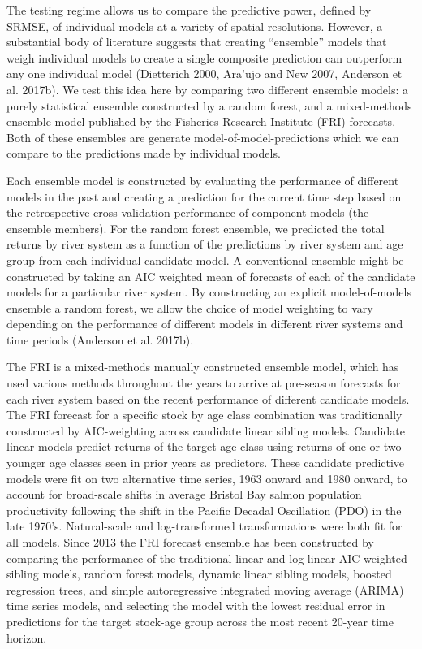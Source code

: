 \documentclass[
]{article}
\begin{document}
The testing regime allows us to compare the predictive power, defined by SRMSE, of individual models at a variety of spatial resolutions. However, a substantial body of literature suggests that creating ``ensemble'' models that weigh individual models to create a single composite prediction can outperform any one individual model (Dietterich 2000, Ara'ujo and New 2007, Anderson et al. 2017b). We test this idea here by comparing two different ensemble models: a purely statistical ensemble constructed by a random forest, and a mixed-methods ensemble model published by the Fisheries Research Institute (FRI) forecasts. Both of these ensembles are generate model-of-model-predictions which we can compare to the predictions made by individual models.

Each ensemble model is constructed by evaluating the performance of different models in the past and creating a prediction for the current time step based on the retrospective cross-validation performance of component models (the ensemble members). For the random forest ensemble, we predicted the total returns by river system as a function of the predictions by river system and age group from each individual candidate model. A conventional ensemble might be constructed by taking an AIC weighted mean of forecasts of each of the candidate models for a particular river system. By constructing an explicit model-of-models ensemble a random forest, we allow the choice of model weighting to vary depending on the performance of different models in different river systems and time periods (Anderson et al. 2017b).

The FRI is a mixed-methods manually constructed ensemble model, which has used various methods throughout the years to arrive at pre-season forecasts for each river system based on the recent performance of different candidate models. The FRI forecast for a specific stock by age class combination was traditionally constructed by AIC-weighting across candidate linear sibling models. Candidate linear models predict returns of the target age class using returns of one or two younger age classes seen in prior years as predictors. These candidate predictive models were fit on two alternative time series, 1963 onward and 1980 onward, to account for broad-scale shifts in average Bristol Bay salmon population productivity following the shift in the Pacific Decadal Oscillation (PDO) in the late 1970's. Natural-scale and log-transformed transformations were both fit for all models. Since 2013 the FRI forecast ensemble has been constructed by comparing the performance of the traditional linear and log-linear AIC-weighted sibling models, random forest models, dynamic linear sibling models, boosted regression trees, and simple autoregressive integrated moving average (ARIMA) time series models, and selecting the model with the lowest residual error in predictions for the target stock-age group across the most recent 20-year time horizon.
\end{document}
